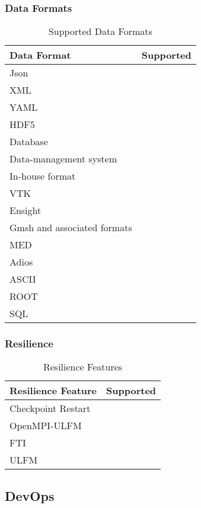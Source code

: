 \subsubsection{Data Formats}
\begin{table}[h!]
    \centering
    \begin{tabular}{|l|c|}
        \hline
        Data Format & Supported \\
        \hline
        Json &  \\
        XML &  \\
        YAML &  \\
        HDF5 &  \\
        Database &  \\
        Data-management system &  \\
        In-house format &  \\
        VTK &  \\
        Ensight &  \\
        Gmsh and associated formats &  \\
        MED &  \\
        Adios &  \\
        ASCII &  \\
        ROOT &  \\
        SQL &  \\
        \hline
    \end{tabular}
    \caption{Supported Data Formats}
\end{table}

\subsubsection{Resilience}
\begin{table}[h!]
    \centering
    \begin{tabular}{|l|c|}
        \hline
        Resilience Feature & Supported \\
        \hline
        Checkpoint Restart &  \\
        OpenMPI-ULFM &  \\
        FTI &  \\
        ULFM &  \\
        \hline
    \end{tabular}
    \caption{Resilience Features}
\end{table}

\subsection{DevOps}
\label{sec:::devops}

